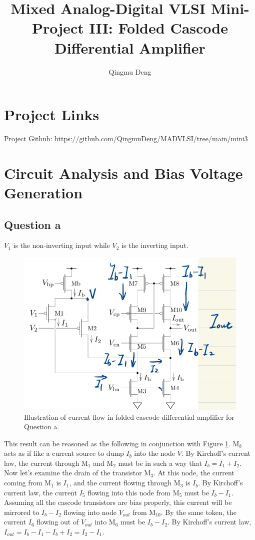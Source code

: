 \documentclass[11pt]{article}
\begin{document}
\title{Mixed Analog-Digital VLSI Mini-Project III: Folded Cascode Differential Amplifier}
\author{Qingmu Deng}
\maketitle %

\tableofcontents

\section*{Project Links}

Project Github: \href{https://github.com/QingmuDeng/MADVLSI/tree/main/mini3}{https://github.com/QingmuDeng/MADVLSI/tree/main/mini3}

\section{Circuit Analysis and Bias Voltage Generation}
    \subsection{Question a}
        $V_1$ is the non-inverting input while $V_2$ is the inverting input.
        \begin{figure}[!ht]
            \centering
            \includegraphics[width=.5\linewidth]{../img/qa.png}
            \caption{Illustration of current flow in folded-cascode differential amplifier for Question a.}
            \label{fig:qa}
        \end{figure}

        This result can be reasoned as the following in conjunction with Figure \ref{fig:qa}. M$_b$ acts as if like a current source to dump $I_b$ into the node $V$. By Kirchoff's current law, the current through M$_1$ and M$_2$ must be in such a way that $I_b=I_1+I_2$. Now let's examine the drain of the transistor M$_3$. At this node, the current coming from M$_1$ is $I_1$, and the current flowing through M$_3$ is $I_b$. By Kirchoff's current law, the current $I_5$ flowing into this node from M$_5$ must be $I_b-I_1$. Assuming all the cascode transistors are bias properly, this current will be mirrored to $I_b-I_2$ flowing into node $V_{out}$ from M$_10$. By the same token, the current $I_6$ flowing out of $V_{out}$ into M$_6$ must be $I_b-I_2$. By Kirchoff's current law, $I_{out}=I_b-I_1-I_b+I_2=I_2-I_1$.
\end{document}
